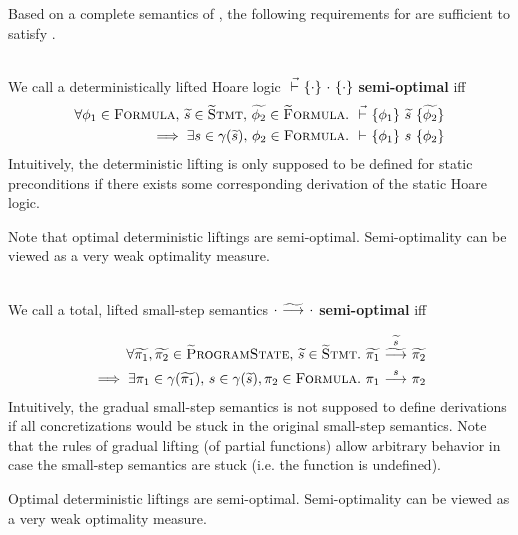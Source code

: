 Based on a complete semantics of \svl, the following requirements for \gvl are sufficient to satisfy .
\begin{definition}~\\
    \label{def:perf-stat}
    We call a deterministically lifted Hoare logic $\dgthoare{}{\cdot}{\cdot}{\cdot}$ \textbf{semi-optimal} iff
    \begin{align*}
    \forall \phi_1 \in \setFormula,\, \grad{s} \in \setGStmt,\, \grad{\phi_2} \in \setGFormula.&~ \dgthoare{}{\phi_1}{\grad{s}}{\grad{\phi_2}}\\ \implies \exists s \in \gamma(\grad{s}),\, \phi_2 \in \setFormula.&~ \thoare{}{\phi_1}{s}{\phi_2}
    \end{align*}
    Intuitively, the deterministic lifting is only supposed to be defined for static preconditions if there exists some corresponding derivation of the static Hoare logic.
    
    Note that optimal deterministic liftings are semi-optimal.
    Semi-optimality can be viewed as a very weak optimality measure.
\end{definition}
\begin{definition}~\\
    \label{def:perf-dyn}
    We call a total, lifted small-step semantics $\gsstep{\cdot}{\cdot}$ \textbf{semi-optimal} iff
    \begin{comment}
    \forall \grad{\pi} \in \setGProgramState.~ (\forall \pi \in \gamma(\grad{\pi}).~ \sstepStuck{\pi}) \implies \gsstep{\grad{\pi}}{\pi_{EX}}
    \end{comment}
    \begin{align*}
    \forall \grad{\pi_1}, \grad{\pi_2} \in \setGProgramState,\, \grad{s} \in \setGStmt.&~ \gsstepConsume{\grad{s}}{\grad{\pi_1}}{\grad{\pi_2}}\\ \implies \exists \pi_1 \in \gamma(\grad{\pi_1}),\, s \in \gamma(\grad{s}), \pi_2 \in \setFormula.&~ \sstepConsume{s}{\pi_1}{\pi_2}
    \end{align*}
    Intuitively, the gradual small-step semantics is not supposed to define derivations if all concretizations would be stuck in the original small-step semantics.
    Note that the rules of gradual lifting (of partial functions) allow arbitrary behavior in case the small-step semantics are stuck (i.e. the function is undefined).
    
    Optimal deterministic liftings are semi-optimal.
    Semi-optimality can be viewed as a very weak optimality measure.
\end{definition}


